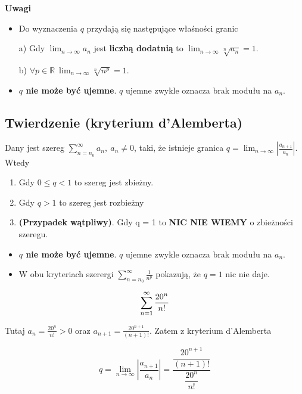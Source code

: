 \textbf{Uwagi}

\begin{itemize}
    \item Do wyznaczenia $q$ przydają się następujące właśności granic
    
    a) Gdy $ \lim_{n \to \infty} a_n $ jest \textbf{liczbą dodatnią} to $ \lim_{n \to \infty} \sqrt[n]{a_n} = 1 $.

    b) $ \forall p \in \mathbb{R} \ \lim_{n \to \infty} \sqrt[n]{n^p} = 1 $.

    \item \textbf{$q$ nie może być ujemne}. $q$ ujemne zwykle oznacza brak modułu na $a_n$.
\end{itemize}


\subsection*{Twierdzenie (kryterium d'Alemberta)}

Dany jest szereg $ \sum\limits_{n = n_0}^{\infty} a_n, \ a_n \neq 0 $, taki, że istnieje granica
$ q = \lim_{n \to \infty} \left| \frac{a_{n + 1}}{a_n} \right| $. Wtedy

\begin{enumerate}
    \item Gdy $ 0 \leq q < 1 $ to szereg jest zbieżny.
    \item Gdy $ q > 1 $ to szereg jest rozbieżny
    \item \textbf{(Przypadek wątpliwy)}. Gdy q = 1 to \textbf{NIC NIE WIEMY} o zbieżności szeregu. \\
\end{enumerate}

\begin{itemize}
    \item \textbf{$q$ nie może być ujemne}. $q$ ujemne zwykle oznacza brak modułu na $a_n$.
    
    \item W obu kryteriach szerergi $ \sum\limits_{n = n_0}^{\infty} \frac{1}{n^p} $ pokazują, że $ q = 1$ nic nie daje. \\
\end{itemize}

\begin{przyklad}

$$ \sum\limits_{n = 1}^{\infty} \frac{20^n}{n!} $$

Tutaj $ a_n = \frac{20^n}{n!} > 0 $ oraz $ a_{n + 1} = \frac{20^{n + 1}}{(n + 1)!} $. Zatem z kryterium d'Alemberta

$$ q = \lim_{n \to \infty} \left| \frac{a_{n + 1}}{a_n} \right| = \frac{ \dfrac{20^{n + 1}}{(n+1)!} }{ \dfrac{20^n}{n!} } $$
\end{przyklad}

